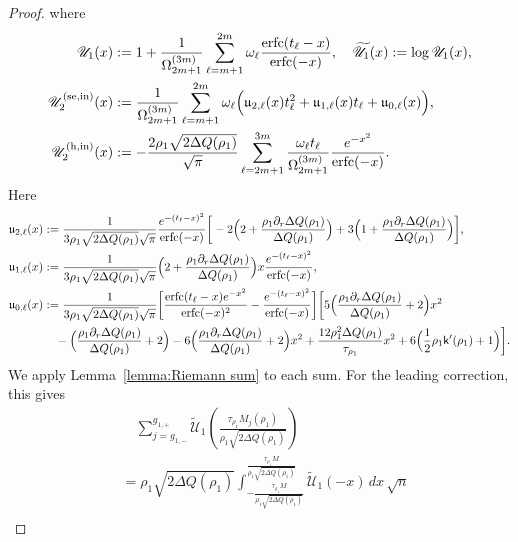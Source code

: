 \documentclass[a4paper]{article}
\newcommand{\erfc}{{\rm erfc}}
\numberwithin{equation}{section}
\begin{document}
\begin{proof}
where
\begin{align*}
\mathscr{U}_{1}(x)&:=  
1+\frac{1}{\Omega_{2m+1}^{(3m)}}\sum_{\ell=m+1}^{2m}\omega_{\ell}\frac{\erfc(t_{\ell}-x)}{\erfc(-x)}, 
\quad
\widetilde{\mathscr{U}}_{1}(x)
:=\log \mathscr{U}_{1}(x), 
\\
\mathscr{U}_{2}^{(\mathrm{se},\mathrm{in})}(x)
&:=
\frac{1}{\Omega_{2m+1}^{(3m)}}
\sum_{\ell=m+1}^{2m}\omega_{\ell}
\Bigl(
\mathfrak{u}_{2,\ell}(x)t_{\ell}^2
+
\mathfrak{u}_{1,\ell}(x)t_{\ell}
+
\mathfrak{u}_{0,\ell}(x)
\Bigr), 
\\
\mathscr{U}_{2}^{(\mathrm{h,in})}(x)
&:=
-
\frac{2\rho_1\sqrt{2\Delta Q(\rho_1)}}{\sqrt{\pi}}
\sum_{\ell=2m+1}^{3m}
\frac{\omega_{\ell}t_{\ell}}{\Omega_{2m+1}^{(3m)}}
\frac{e^{-x^2}}{\erfc(-x)}. 
\end{align*}
Here 
\begin{align*}
\mathfrak{u}_{2,\ell}(x)&:=
\frac{1}{3\rho_1\sqrt{2\Delta Q(\rho_1)}\sqrt{\pi}}
\frac{e^{-(t_{\ell}-x)^2}}{\erfc(-x)}
\bigg[
-2\Bigl(2+\frac{\rho_1\partial_r\Delta Q(\rho_1)}{\Delta Q(\rho_1)}\Bigr)
+3\Bigl(1+\frac{\rho_1\partial_r\Delta Q(\rho_1)}{\Delta Q(\rho_1)}\Bigr)
\bigg], 
\\
\mathfrak{u}_{1,\ell}(x)&:=
\frac{1}{3\rho_1\sqrt{2\Delta Q(\rho_1)}\sqrt{\pi}}
\Bigl(2+\frac{\rho_1\partial_r\Delta Q(\rho_1)}{\Delta Q(\rho_1)}\Bigr)
x
\frac{e^{-(t_{\ell}-x)^2}}{\erfc(-x)}, 
\\
\mathfrak{u}_{0,\ell}(x)&:=
\frac{1}{3\rho_1\sqrt{2\Delta Q(\rho_1)}\sqrt{\pi}}
\bigg[
\frac{\erfc(t_{\ell}-x)e^{-x^2}}{\erfc(-x)^2}
-\frac{e^{-(t_{\ell}-x)^2}}{\erfc(-x)}
\bigg]
\bigg[
5\Bigl( 
\frac{\rho_1\partial_r\Delta Q(\rho_1)}{\Delta Q(\rho_1)}+2
\Bigr)
x^2
\\
&\quad 
-\Bigl( \frac{\rho_1\partial_r\Delta Q(\rho_1)}{\Delta Q(\rho_1)}+2\Bigr)
-6\Bigl( 
\frac{\rho_1\partial_r\Delta Q(\rho_1)}{\Delta Q(\rho_1)}+2
\Bigr)x^2
+\frac{12\rho_1^2\Delta Q(\rho_1)}{\tau_{\rho_1}}x^2
+6\Bigl(\frac{1}{2}\rho_1\mathsf{k}'(\rho_1)+1\Bigr)
\bigg].
\end{align*}
We apply Lemma~\ref{lemma:Riemann sum} to each sum.  For the leading
correction, this gives
\begin{align*}
&\quad \sum_{j=g_{1,-}}^{g_{1,+}}
\widetilde{\mathscr{U}}_{1}(\tfrac{\tau_{\rho_1}M_j(\rho_1)}{\rho_1\sqrt{2\Delta Q(\rho_1)}})
\\
&=
\rho_1\sqrt{2\Delta Q(\rho_1)}\int_{-\frac{\tau_{\rho_1}M}{\rho_1\sqrt{2\Delta Q(\rho_1)}}}^{\frac{\tau_{\rho_1}M}{\rho_1\sqrt{2\Delta Q(\rho_1)}}}
\widetilde{\mathscr{U}}_1(-x)\,dx\,\sqrt{n}
\\

\end{align*}
\end{proof}
\end{document}
